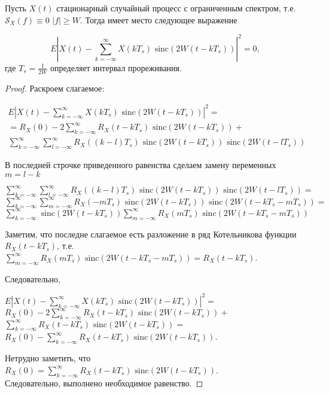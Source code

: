 \begin{theorem}[Котельникова]
Пусть $X(t)$ стационарный случайный процесс с ограниченным спектром, т.е. $\mathcal{S}_X (f) \equiv 0$ $|f| \geq W $.
Тогда имеет место следующее выражение

{
\centering
\begin{equation}
    E \left| X(t) - \sum\limits_{k=-\infty}^{\infty} X(k T_s) \text{ sinc}(2 W (t-k T_s)) \right| ^ 2 = 0,
\end{equation}
}
где $T_s = \frac{1}{2W}$ определяет интервал прореживания.\\
\end{theorem}
\begin{proof}
Раскроем слагаемое:

\begin{equation*}
	\begin{gathered}
		E \left| X(t) - \sum\limits_{k=-\infty}^{\infty} X(k T_s) \text{ sinc}(2 W (t-k T_s)) \right| ^ 2 = \\
		= R_X(0) - 2\sum\limits_{k=-\infty}^{\infty}R_X(t-k T_s) \text{ sinc}(2 W (t-k T_s)) +\\
		\sum\limits_{k=-\infty}^{\infty}\sum\limits_{l=-\infty}^{\infty} R_X((k-l) T_s)\text{ sinc}(2W(t-k T_s))\text{ sinc}(2W(t-l T_s))
	\end{gathered}
\end{equation*}


В последней строчке приведенного равенства сделаем замену переменных $m = l - k$

{\centering

$\sum\limits_{k=-\infty}^{\infty}\sum\limits_{l=-\infty}^{\infty} R_X((k-l) T_s)\text{ sinc}(2W(t-k T_s))\text{ sinc}(2W(t-l T_s))=$\\
$\sum\limits_{k=-\infty}^{\infty}\sum\limits_{m=-\infty}^{\infty} R_X(-m T_s)\text{ sinc}(2W(t-k T_s))\text{ sinc}(2W(t-k T_s - mT_s)) = $ \\
$\sum\limits_{k=-\infty}^{\infty} \text{ sinc}(2W(t-kT_s)) \sum\limits_{m=-\infty}^{\infty} R_X(mT_s) \text{ sinc}(2W(t-kT_s-mT_s))$
}
Заметим, что последне слагаемое есть разложение в ряд Котельникова функции $R_X(t-kT_s)$, т.е.\\
$\sum\limits_{m=-\infty}^{\infty} R_X(mT_s) \text{ sinc}(2W(t-kT_s-mT_s)) = R_X(t-kT_s)$.

Следовательно, 

{
\centering
$E| X(t) - \sum\limits_{k=-\infty}^{\infty} X(k T_s) \text{ sinc}(2 W (t-k T_s)) | ^ 2 = $\\
$R_X(0) - 2\sum\limits_{k=-\infty}^{\infty}R_X(t-k T_s) \text{ sinc}(2 W (t-k T_s)) +$\\
$\sum\limits_{k=-\infty}^{\infty}R_X(t-k T_s) \text{ sinc}(2 W (t-k T_s))=$\\
$R_X(0) - \sum\limits_{k=-\infty}^{\infty}R_X(t-k T_s) \text{ sinc}(2 W (t-k T_s))$.
}

Нетрудно заметить, что \\ 
$R_X(0) = \sum\limits_{k=-\infty}^{\infty}R_X(t-k T_s) \text{ sinc}(2 W (t-k T_s))$.\\
Следовательно, выполнено необходимое равенство. 

\end{proof}
